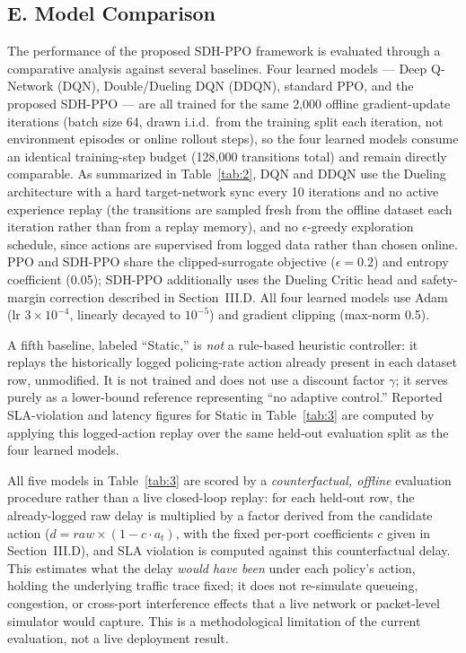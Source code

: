 \documentclass[conference]{IEEEtran}
\begin{document}
\subsection{E. Model Comparison}\label{e.-model-comparison}

The performance of the proposed SDH-PPO framework is evaluated through a comparative analysis against several baselines. Four learned models --- Deep Q-Network (DQN), Double/Dueling DQN (DDQN), standard PPO, and the proposed SDH-PPO --- are all trained for the same 2,000 offline gradient-update iterations (batch size 64, drawn i.i.d.\ from the training split each iteration, not environment episodes or online rollout steps), so the four learned models consume an identical training-step budget (128,000 transitions total) and remain directly comparable. As summarized in Table~\ref{tab:2}, DQN and DDQN use the Dueling architecture with a hard target-network sync every 10 iterations and no active experience replay (the transitions are sampled fresh from the offline dataset each iteration rather than from a replay memory), and no \(\epsilon\)-greedy exploration schedule, since actions are supervised from logged data rather than chosen online. PPO and SDH-PPO share the clipped-surrogate objective (\(\epsilon=0.2\)) and entropy coefficient (0.05); SDH-PPO additionally uses the Dueling Critic head and safety-margin correction described in Section~III.D. All four learned models use Adam (lr \(3\times10^{-4}\), linearly decayed to \(10^{-5}\)) and gradient clipping (max-norm 0.5).

A fifth baseline, labeled ``Static,'' is \emph{not} a rule-based heuristic controller: it replays the historically logged policing-rate action already present in each dataset row, unmodified. It is not trained and does not use a discount factor \(\gamma\); it serves purely as a lower-bound reference representing ``no adaptive control.'' Reported SLA-violation and latency figures for Static in Table~\ref{tab:3} are computed by applying this logged-action replay over the same held-out evaluation split as the four learned models.

All five models in Table~\ref{tab:3} are scored by a \emph{counterfactual, offline} evaluation procedure rather than a live closed-loop replay: for each held-out row, the already-logged raw delay is multiplied by a factor derived from the candidate action (\(d = raw \times (1 - c \cdot a_t)\), with the fixed per-port coefficients \(c\) given in Section~III.D), and SLA violation is computed against this counterfactual delay. This estimates what the delay \emph{would have been} under each policy's action, holding the underlying traffic trace fixed; it does not re-simulate queueing, congestion, or cross-port interference effects that a live network or packet-level simulator would capture. This is a methodological limitation of the current evaluation, not a live deployment result.
\end{document}
